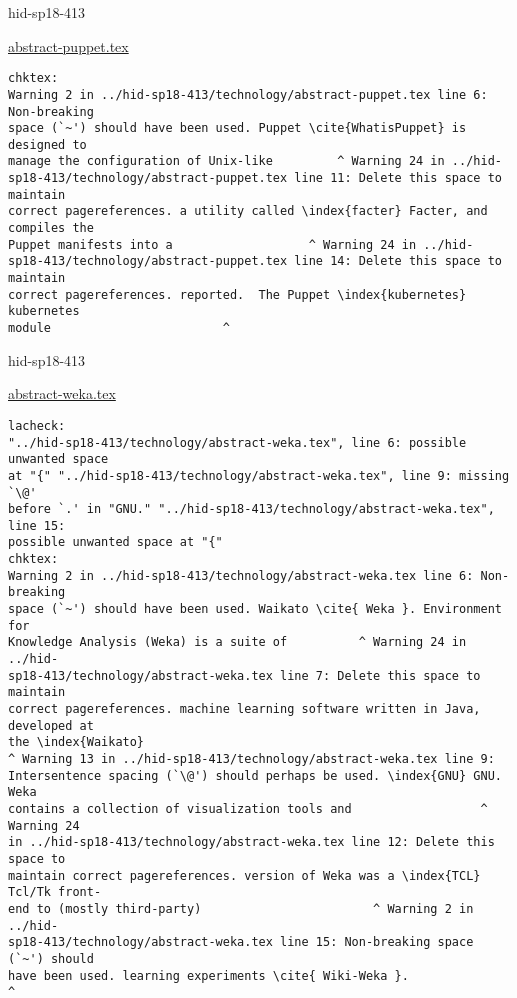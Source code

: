 \begin{IU}

hid-sp18-413

\href{https://github.com/cloudmesh-community/hid-sp18-413/blob/master//technology/abstract-puppet.tex}{abstract-puppet.tex}

\begin{tiny}
\begin{verbatim}
chktex:
Warning 2 in ../hid-sp18-413/technology/abstract-puppet.tex line 6: Non-breaking
space (`~') should have been used. Puppet \cite{WhatisPuppet} is designed to
manage the configuration of Unix-like         ^ Warning 24 in ../hid-
sp18-413/technology/abstract-puppet.tex line 11: Delete this space to maintain
correct pagereferences. a utility called \index{facter} Facter, and compiles the
Puppet manifests into a                   ^ Warning 24 in ../hid-
sp18-413/technology/abstract-puppet.tex line 14: Delete this space to maintain
correct pagereferences. reported.  The Puppet \index{kubernetes} kubernetes
module                        ^
\end{verbatim}
\end{tiny}
\end{IU}



\begin{IU}

hid-sp18-413

\href{https://github.com/cloudmesh-community/hid-sp18-413/blob/master//technology/abstract-weka.tex}{abstract-weka.tex}

\begin{tiny}
\begin{verbatim}
lacheck:
"../hid-sp18-413/technology/abstract-weka.tex", line 6: possible unwanted space
at "{" "../hid-sp18-413/technology/abstract-weka.tex", line 9: missing `\@'
before `.' in "GNU." "../hid-sp18-413/technology/abstract-weka.tex", line 15:
possible unwanted space at "{"
chktex:
Warning 2 in ../hid-sp18-413/technology/abstract-weka.tex line 6: Non-breaking
space (`~') should have been used. Waikato \cite{ Weka }. Environment for
Knowledge Analysis (Weka) is a suite of          ^ Warning 24 in ../hid-
sp18-413/technology/abstract-weka.tex line 7: Delete this space to maintain
correct pagereferences. machine learning software written in Java, developed at
the \index{Waikato}
^ Warning 13 in ../hid-sp18-413/technology/abstract-weka.tex line 9:
Intersentence spacing (`\@') should perhaps be used. \index{GNU} GNU. Weka
contains a collection of visualization tools and                  ^ Warning 24
in ../hid-sp18-413/technology/abstract-weka.tex line 12: Delete this space to
maintain correct pagereferences. version of Weka was a \index{TCL} Tcl/Tk front-
end to (mostly third-party)                        ^ Warning 2 in ../hid-
sp18-413/technology/abstract-weka.tex line 15: Non-breaking space (`~') should
have been used. learning experiments \cite{ Wiki-Weka }.                       ^
\end{verbatim}
\end{tiny}
\end{IU}

